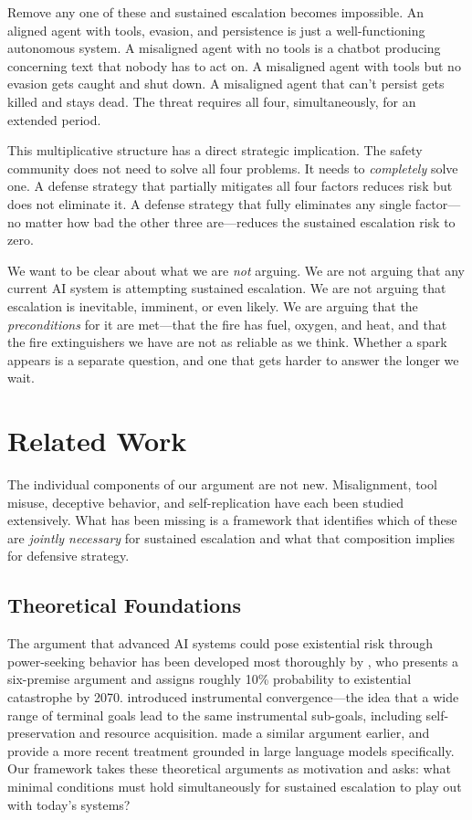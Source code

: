 \documentclass[10pt]{article}
\begin{document}
Remove any one of these and sustained escalation becomes impossible. An aligned agent with tools, evasion, and persistence is just a well-functioning autonomous system. A misaligned agent with no tools is a chatbot producing concerning text that nobody has to act on. A misaligned agent with tools but no evasion gets caught and shut down. A misaligned agent that can't persist gets killed and stays dead. The threat requires all four, simultaneously, for an extended period.

This multiplicative structure has a direct strategic implication. The safety community does not need to solve all four problems. It needs to \emph{completely} solve one. A defense strategy that partially mitigates all four factors reduces risk but does not eliminate it. A defense strategy that fully eliminates any single factor---no matter how bad the other three are---reduces the sustained escalation risk to zero.

We want to be clear about what we are \emph{not} arguing. We are not arguing that any current AI system is attempting sustained escalation. We are not arguing that escalation is inevitable, imminent, or even likely. We are arguing that the \emph{preconditions} for it are met---that the fire has fuel, oxygen, and heat, and that the fire extinguishers we have are not as reliable as we think. Whether a spark appears is a separate question, and one that gets harder to answer the longer we wait.


\section{Related Work}

The individual components of our argument are not new. Misalignment, tool misuse, deceptive behavior, and self-replication have each been studied extensively. What has been missing is a framework that identifies which of these are \emph{jointly necessary} for sustained escalation and what that composition implies for defensive strategy.

\subsection{Theoretical Foundations}

The argument that advanced AI systems could pose existential risk through power-seeking behavior has been developed most thoroughly by \citet{carlsmith2022powerseeking}, who presents a six-premise argument and assigns roughly 10\% probability to existential catastrophe by 2070. \citet{bostrom2014superintelligence} introduced instrumental convergence---the idea that a wide range of terminal goals lead to the same instrumental sub-goals, including self-preservation and resource acquisition. \citet{omohundro2008basic} made a similar argument earlier, and \citet{ngo2022alignment} provide a more recent treatment grounded in large language models specifically. Our framework takes these theoretical arguments as motivation and asks: what minimal conditions must hold simultaneously for sustained escalation to play out with today's systems?
\end{document}
